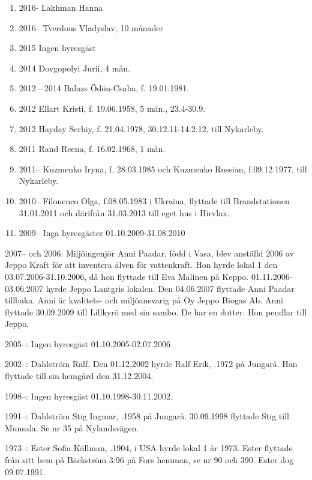 \begin{enumerate}
  \item 2016-       Lakhman Hanna
  \item 2016--   Tverdous Vladyslav, 10 månader
  \item 2015        Ingen hyresgäst
  \item 2014        Dovgopolyi Jurii, 4 mån.
  \item 2012—2014		Balazs Ödön-Csaba, f. 19.01.1981.
  \item 2012	      Ellart Kristi, f. 19.06.1958,  5 mån., 23.4-30.9.
  \item 2012        Hayday Serhiy, f. 21.04.1978, 30.12.11-14.2.12, till Nykarleby.
  \item 2011        Rand Reena, f. 16.02.1968, 1 mån.
  \item 2011--		Kuzmenko Iryna, f. 28.03.1985 och Kuzmenko Russian, f.09.12.1977, till Nykarleby.
  \item 2010--		Filonenco Olga, f.08.05.1983 i Ukraina, flyttade till Brandstationen 31.01.2011 och därifrån 31.03.2013 till eget hus i Hirvlax.
  \item 2009--		Inga hyresgäster 01.10.2009-31.08.2010
\end{enumerate}

2007-- och 2006:
Miljöingenjör Anni Paadar, född i Vasa, blev anställd 2006 av Jeppo Kraft för att inventera älven för vattenkraft. Hon hyrde lokal 1 den 03.07.2006-31.10.2006, då hon flyttade till Eva Malinen på Keppo.	01.11.2006-03.06.2007 hyrde Jeppo Lantgris lokalen. Den 04.06.2007 flyttade Anni Paadar tillbaka. Anni är kvalitets- och miljöansvarig på Oy Jeppo Biogas Ab. Anni flyttade 30.09.2009 till Lillkyrö med sin sambo. De har en dotter. Hon pendlar till Jeppo.

2005--:
Ingen hyresgäst 01.10.2005-02.07.2006

2002--:
Dahlström Ralf. Den 01.12.2002 hyrde Ralf	Erik, .1972 på Jungarå. Han flyttade till sin hemgård den 31.12.2004.

1998--:
Ingen hyresgäst 01.10.1998-30.11.2002.

1991--:
Dahlström Stig Ingmar, .1958 på Jungarå. 30.09.1998 flyttade Stig till Munsala. Se nr 35 på Nylandsvägen.

1973--:
Ester Sofia Källman, .1904, i USA hyrde lokal 1 år 1973. Ester flyttade från sitt hem på Bäckström 3:96 på Fors hemman, se nr 90 och 390. Ester dog 09.07.1991.




